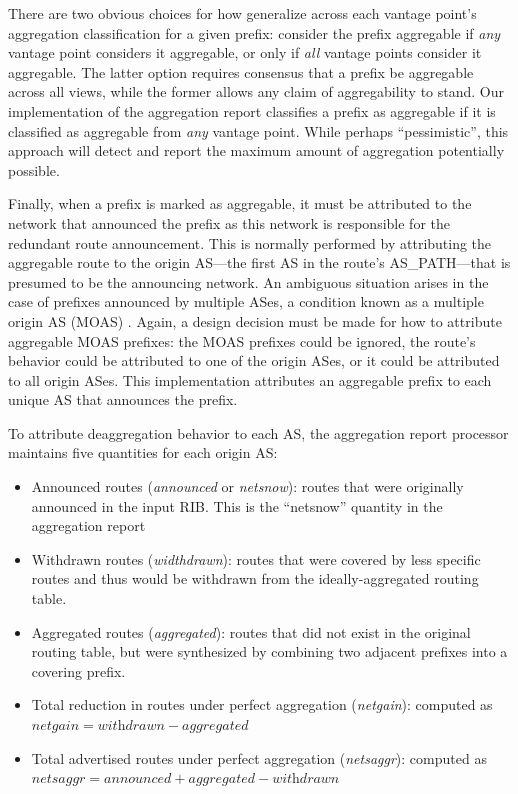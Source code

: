 There are two obvious choices for how generalize across each vantage point's aggregation classification for a given prefix: consider the prefix aggregable if \emph{any} vantage point considers it aggregable, or only if \emph{all} vantage points consider it aggregable. The latter option requires consensus that a prefix be aggregable across all views, while the former allows any claim of aggregability to stand. Our implementation of the aggregation report classifies a prefix as aggregable if it is classified as aggregable from \emph{any} vantage point. While perhaps ``pessimistic'', this approach will detect and report the maximum amount of aggregation potentially possible.


Finally, when a prefix is marked as aggregable, it must be attributed to the network that announced the prefix as this network is responsible for the redundant route announcement. This is normally performed by attributing the aggregable route to the origin AS---the first AS in the route's AS\_PATH---that is presumed to be the announcing network. An ambiguous situation arises in the case of prefixes announced by multiple ASes, a condition known as a multiple origin AS (MOAS) \cite{Zhao:2001ly}. Again, a design decision must be made for how to attribute aggregable MOAS prefixes: the MOAS prefixes could be ignored, the route's behavior could be attributed to one of the origin ASes, or it could be attributed to all origin ASes. This implementation attributes an aggregable prefix to each unique AS that announces the prefix.

To attribute deaggregation behavior to each AS, the aggregation report processor maintains five quantities for each origin AS:

\begin{itemize}
\item{Announced routes (\emph{announced} or \emph{netsnow}): routes that were originally announced in the input RIB. This is the ``netsnow'' quantity in the aggregation report}
\item{Withdrawn routes (\emph{widthdrawn}): routes that were covered by less specific routes and thus would be withdrawn from the ideally-aggregated routing table.}
\item{Aggregated routes (\emph{aggregated}): routes that did not exist in the original routing table, but were synthesized by combining two adjacent prefixes into a covering prefix.}
\item{Total reduction in routes under perfect aggregation (\emph{netgain}): computed as $\textit{netgain} = \textit{withdrawn} - \textit{aggregated}$}
\item{Total advertised routes under perfect aggregation (\emph{netsaggr}): computed as $\textit{netsaggr}=\textit{announced} + \textit{aggregated} - \textit{withdrawn}$}
\end{itemize}

